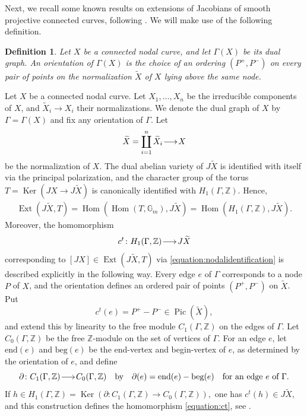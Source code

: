 \documentclass[a4paper,11pt,reqno]{amsart}
\makeatletter
\numberwithin{equation}{section}
\theoremstyle{plain}
\newtheorem{definition}[theorem]{Definition}
\theoremstyle{definition}
\newcommand{\Z}{\mathbb Z}
\newcommand{\G}{\mathbb G}
\newcommand{\Hom}{\operatorname{Hom}}
\newcommand{\Pic}{\operatorname{Pic}}
\newcommand{\Ext}{\operatorname{Ext}}
\newcommand{\Ker}{\operatorname{Ker}}
\newcommand{\wt}[1]{{\widetilde{#1}}}
\renewcommand{\longrightarrow}{\xymatrix@1@=15pt{\ar[r]&}}
\makeatother
\begin{document}
Next, we recall some known results on extensions of Jacobians of smooth projective connected curves, following \cite[Sections 2.2--2.4]{alexeev-compactifiedjacobians}.  We will make use of the following definition. 
\begin{definition} \label{definition:orientation}
Let $X$ be a connected nodal curve, and let $ \Gamma(X)$ be its dual graph. An \emph{orientation} of $\Gamma(X)$ is the choice of an ordering $(P^+, P^-)$ on every pair of points on the normalization $\wt X$ of $X$ lying above the same node.
\end{definition}
Let $X$ be a connected nodal curve. Let $X_1, \dotsc, X_n$ be the irreducible components of $X$, and $ \widetilde X_i \to X_i$ their normalizations. 
We denote the dual graph of $X$ by $\Gamma = \Gamma(X)$ and fix any orientation of $\Gamma$.
Let $$ \wt X = \coprod_{i = 1}^n \wt X_i \longrightarrow X$$ be the normalization of $X$. The dual abelian variety of $J \wt X$ is identified with itself via the principal polarization, and the character group of the torus $T = \Ker(JX \to J\wt X)$ is canonically identified with $H_1(\Gamma,\Z)$.
Hence, 
\begin{align} \label{equation:nodalidentification}
\Ext(J\wt X, T) = \Hom(\Hom(T,\G_m), J\wt X) = \Hom(H_1(\Gamma,\Z), J\wt X).
\end{align}
Moreover, the homomorphism 
\begin{align} \label{equation:ct}
c^t \colon H_1(\Gamma,\Z) \longrightarrow J\wt X
\end{align}
corresponding to $[JX] \in \Ext(J \wt X,T)$ via \eqref{equation:nodalidentification} is described explicitly in the following way. 
Every edge $e$ of $\Gamma$ corresponds to a node $P$ of $X$, and the orientation defines an ordered pair of points $(P^{+}, P^{-})$ on $\wt X$.
Put
\[
c^t(e) = P^+ - P^{-} \in \Pic(\wt X), 
\]
and extend this by linearity to the free module $C_1(\Gamma,\Z)$ on the edges of $\Gamma$. Let $C_0(\Gamma,\Z)$ be the free $\Z$-module on the set of vertices of $\Gamma$. For an edge $e$, let $\text{end}(e)$ and $\text{beg}(e)$ be the end-vertex and begin-vertex of $e$, as determined by the orientation of $e$, and define
\[
\partial \colon C_1(\Gamma,\Z) \longrightarrow C_0(\Gamma,\Z) \quad \text{by} \quad \partial(e) = \text{end}(e) - \text{beg}(e) \quad \text{for an edge } e \text{ of } \Gamma.
\]
If
$h \in H_1(\Gamma,\Z) = \Ker(\partial \colon C_1(\Gamma,\Z) \to C_0(\Gamma,\Z)),$ one has $c^t(h)  \in J\wt X$, and this construction defines the homomorphism \eqref{equation:ct}, see \cite[Section 2.4]{alexeev-compactifiedjacobians}. 
\end{document}
